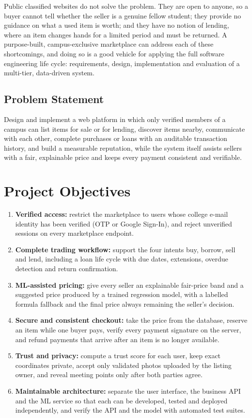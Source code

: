 \documentclass[11pt,letterpaper,oneside]{report}
\begin{document}
Public classified websites do not solve the problem. They are open to anyone, so a buyer cannot
tell whether the seller is a genuine fellow student; they provide no guidance on what a used item
is worth; and they have no notion of lending, where an item changes hands for a limited period
and must be returned. A purpose-built, campus-exclusive marketplace can address each of these
shortcomings, and doing so is a good vehicle for applying the full software engineering life cycle:
requirements, design, implementation and evaluation of a multi-tier, data-driven system.

\subsection{Problem Statement}
Design and implement a web platform in which only verified members of a campus can list items
for sale or for lending, discover items nearby, communicate with each other, complete purchases or
loans with an auditable transaction history, and build a measurable reputation, while the system
itself assists sellers with a fair, explainable price and keeps every payment consistent and
verifiable.

\section{Project Objectives}
\begin{enumerate}
  \item \textbf{Verified access:} restrict the marketplace to users whose college e-mail identity has been
        verified (OTP or Google Sign-In), and reject unverified sessions on every marketplace endpoint.
  \item \textbf{Complete trading workflow:} support the four intents buy, borrow, sell and lend, including
        a loan life cycle with due dates, extensions, overdue detection and return confirmation.
  \item \textbf{ML-assisted pricing:} give every seller an explainable fair-price band and a suggested
        price produced by a trained regression model, with a labelled formula fallback and the final
        price always remaining the seller's decision.
  \item \textbf{Secure and consistent checkout:} take the price from the database, reserve an item while
        one buyer pays, verify every payment signature on the server, and refund payments that
        arrive after an item is no longer available.
  \item \textbf{Trust and privacy:} compute a trust score for each user, keep exact coordinates private,
        accept only validated photos uploaded by the listing owner, and reveal meeting points only
        after both parties agree.
  \item \textbf{Maintainable architecture:} separate the user interface, the business API and the ML
        service so that each can be developed, tested and deployed independently, and verify the API
        and the model with automated test suites.
\end{enumerate}
\end{document}
